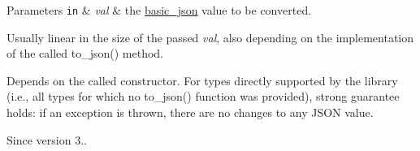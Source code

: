 \begin{DoxyParams}[1]{Parameters}
\mbox{\tt in}  & {\em val} & the \mbox{\hyperlink{classnlohmann_1_1basic__json}{basic\+\_\+json}} value to be converted.\\
\hline
\end{DoxyParams}
Usually linear in the size of the passed {\itshape val}, also depending on the implementation of the called {\ttfamily to\+\_\+json()} method.

Depends on the called constructor. For types directly supported by the library (i.\+e., all types for which no {\ttfamily to\+\_\+json()} function was provided), strong guarantee holds\+: if an exception is thrown, there are no changes to any J\+S\+ON value.

\begin{DoxySince}{Since}
version 3.. 
\end{DoxySince}
\mbox{\label{classnlohmann_1_1basic__json_ab5dfd9a2b2663b219641cb7fe59b6da2}} 

